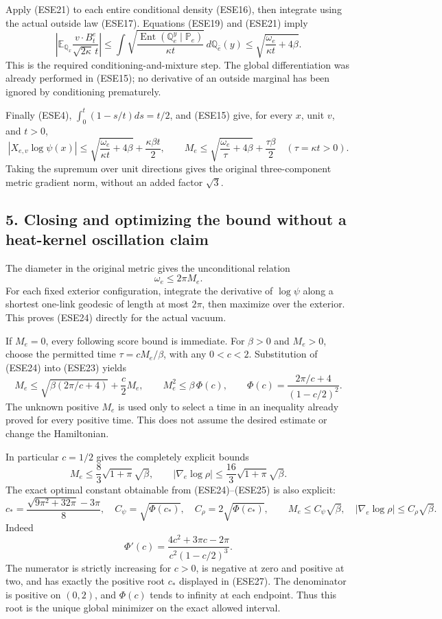 \documentclass[11pt]{article}
\begin{document}
Apply (ESE21) to each entire conditional density (ESE16), then integrate using the actual outside law (ESE17). Equations (ESE19) and (ESE21) imply
\[
 \left|\mathbb E_{\mathbb Q_x}
       \frac{v\cdot B_t^e}{\sqrt{2\kappa}\,t}\right|
 \le\int\sqrt{\frac{\operatorname{Ent}(\mathbb Q_e^y\mid\mathbb P_e)}
                         {\kappa t}}\,d\mathbb Q_{\bar e}(y)
 \le\sqrt{\frac{\omega_e}{\kappa t}+4\beta}.
 \tag{ESE22}
\]
This is the required conditioning-and-mixture step. The global differentiation was already performed in (ESE15); no derivative of an outside marginal has been ignored by conditioning prematurely.

Finally (ESE4), \(\int_0^t(1-s/t)ds=t/2\), and (ESE15) give, for every \(x\), unit \(v\), and \(t>0\),
\[
 \boxed{\displaystyle
 |X_{e,v}\log\psi(x)|
 \le\sqrt{\frac{\omega_e}{\kappa t}+4\beta}
                          +\frac{\kappa\beta t}{2},
 \qquad
 M_e\le\sqrt{\frac{\omega_e}{\tau}+4\beta}+\frac{\tau\beta}{2}
 \quad(\tau=\kappa t>0).}
 \tag{ESE23}
\]
Taking the supremum over unit directions gives the original three-component metric gradient norm, without an added factor \(\sqrt3\).

\subsection*{5. Closing and optimizing the bound without a heat-kernel oscillation claim}

The diameter in the original metric gives the unconditional relation
\[
 \omega_e\le2\pi M_e.
 \tag{ESE24}
\]
For each fixed exterior configuration, integrate the derivative of \(\log\psi\) along a shortest one-link geodesic of length at most \(2\pi\), then maximize over the exterior. This proves (ESE24) directly for the actual vacuum.

If \(M_e=0\), every following score bound is immediate. For \(\beta>0\) and \(M_e>0\), choose the permitted time \(\tau=cM_e/\beta\), with any \(0<c<2\). Substitution of (ESE24) into (ESE23) yields
\[
 M_e\le\sqrt{\beta(2\pi/c+4)}+\frac c2M_e,\qquad
 M_e^2\le\beta\,\Phi(c),\qquad
 \Phi(c)=\frac{2\pi/c+4}{(1-c/2)^2}.
 \tag{ESE25}
\]
The unknown positive \(M_e\) is used only to select a time in an inequality already proved for every positive time. This does not assume the desired estimate or change the Hamiltonian.

In particular \(c=1/2\) gives the completely explicit bounds
\[
 M_e\le\frac83\sqrt{1+\pi}\sqrt{\beta},\qquad
 |\nabla_e\log\rho|
       \le\frac{16}{3}\sqrt{1+\pi}\sqrt{\beta}.
 \tag{ESE26}
\]
The exact optimal constant obtainable from (ESE24)–(ESE25) is also explicit:
\[
 c_*=\frac{\sqrt{9\pi^2+32\pi}-3\pi}{8},\quad
 C_\psi=\sqrt{\Phi(c_*)},\quad C_\rho=2\sqrt{\Phi(c_*)},\qquad
 \boxed{M_e\le C_\psi\sqrt{\beta},\quad
             |\nabla_e\log\rho|\le C_\rho\sqrt{\beta}.}
 \tag{ESE27}
\]
Indeed
\[
 \Phi'(c)=
   \frac{4c^2+3\pi c-2\pi}{c^2(1-c/2)^3}.
 \tag{ESE28}
\]
The numerator is strictly increasing for \(c>0\), is negative at zero and positive at two, and has exactly the positive root \(c_*\) displayed in (ESE27). The denominator is positive on \((0,2)\), and \(\Phi(c)\) tends to infinity at each endpoint. Thus this root is the unique global minimizer on the exact allowed interval.
\end{document}
